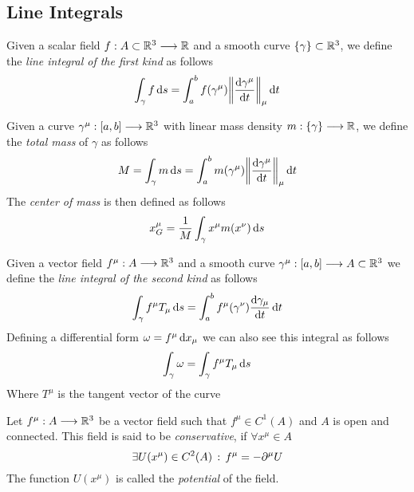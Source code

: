 \documentclass[../complete.tex]{subfiles}
\begin{document}
\subsection{Line Integrals}
\begin{dfn}
	Given a scalar field $f:A\subset\mathbb{R}^3\overset{}{\longrightarrow}\mathbb{R}$ and a smooth curve $\{\gamma\}\subset\mathbb{R}^3$, we define the \textit{line integral of the first kind} as follows
	\begin{equation}
		\int_{\gamma}^{}f\diff s=\int_{a}^{b}f(\gamma^\mu)\norm{\derivative{\gamma^\mu}{t}}_\mu\diff t
		\label{eq:lineint1R}
	\end{equation}
\end{dfn}
\begin{thm}
	Given a curve $\gamma^\mu:[a,b]\overset{}{\longrightarrow}\mathbb{R}^3$ with linear mass density $m:\{\gamma\}\overset{}{\longrightarrow}\mathbb{R}$, we define the \textit{total mass} of $\gamma$ as follows
	\begin{equation}
		M=\int_{\gamma}^{}m\diff s=\int_{a}^{b}m(\gamma^\mu)\norm{\derivative{\gamma^\mu}{t}}_\mu\diff t
		\label{eq:totalmasscurve}
	\end{equation}
	The \textit{center of mass} is then defined as follows
	\begin{equation}
		x_G^\mu=\frac{1}{M}\int_{\gamma}^{}x^\mu m(x^\nu)\operatorname{d\!} s
		\label{eq:centerofmasscurve}
	\end{equation}
\end{thm}
\begin{dfn}
	Given a vector field $f^\mu:A\overset{}{\longrightarrow}\mathbb{R}^3$ and a smooth curve $\gamma^\mu:[a,b]\overset{}{\longrightarrow} A\subset\mathbb{R}^3$ we define the \textit{line integral of the second kind} as follows
	\begin{equation}
		\int_{\gamma}^{}f^\mu T_\mu\diff s=\int_{a}^{b}f^\mu(\gamma^\nu)\derivative{\gamma_\mu}{t}\diff t
		\label{eq:lineint2R}
	\end{equation}
	Defining a differential form $\omega=f^\mu\operatorname{d\!} x_\mu$ we can also see this integral as follows
	\begin{equation}
		\int_{\gamma}^{}\omega=\int_{\gamma}^{}f^\mu T_\mu\operatorname{d\!} s
		\label{eq:lineintdiffform}
	\end{equation}
	Where $T^\mu$ is the tangent vector of the curve
\end{dfn}
\begin{dfn}
	Let $f^\mu:A\overset{}{\longrightarrow}\mathbb{R}^3$ be a vector field such that $f^\mu\in C^1(A)$ and $A$ is open and connected. This field is said to be \textit{conservative}, if $\forall x^\mu\in A$
	\begin{equation}
		\exists U(x^\mu)\in C^2(A)\, :\,  f^\mu=-\partial^\mu U
		\label{eq:conservativefield}
	\end{equation}
	The function $U(x^\mu)$ is called the \textit{potential} of the field.\\
\end{dfn}
\end{document}
